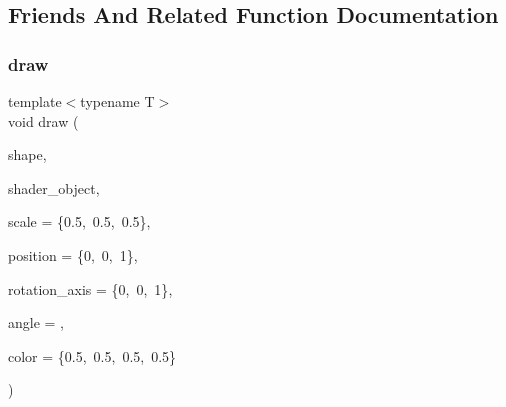\subsection{Friends And Related Function Documentation}
\mbox{\label{classShape_a0f7d9c8330ae4f062c6f569a7400e1f0}} 
\subsubsection{\texorpdfstring{draw}{draw}\hspace{0.1cm}{\footnotesize\ttfamily [1/2]}}
{\footnotesize\ttfamily template$<$typename T$>$ \\
void draw (\begin{DoxyParamCaption}\item[{\mbox{\hyperlink{classShape}{Shape}}$<$ T $>$ \&}]{shape,  }\item[{\mbox{\hyperlink{classShader}{Shader}}$<$ \mbox{\hyperlink{render_8hpp_a24e288e18eb7b6e01de7565001fedb60aa98862073f71a928bad5099cc3e1c2ed}{R\+E\+N\+D\+E\+R\+\_\+\+T\+Y\+P\+E\+::\+U\+N\+I\+F\+O\+R\+M\+\_\+\+C\+O\+L\+OR}} $>$ \&}]{shader\+\_\+object,  }\item[{std\+::array$<$ float, 3 $>$}]{scale = {\ttfamily \{0.5,~0.5,~0.5\}},  }\item[{std\+::array$<$ float, 3 $>$}]{position = {\ttfamily \{0,~0,~1\}},  }\item[{std\+::array$<$ float, 3 $>$}]{rotation\+\_\+axis = {\ttfamily \{0,~0,~1\}},  }\item[{float}]{angle = {},  }\item[{glm\+::vec4}]{color = {\ttfamily \{0.5,~0.5,~0.5,~0.5\}} }\end{DoxyParamCaption})\hspace{0.3cm}{\ttfamily [friend]}}

\mbox{\label{classShape_a29e514c040e0781bfa2e08bcde4a7557}} 
